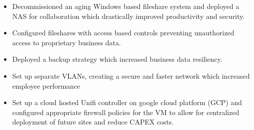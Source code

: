 \begin{itemize}
    \item Decommissioned an aging Windows based fileshare system and deployed a NAS for collaboration which drastically improved productivity and security.
    \item Configured fileshares with access based controls preventing unauthorized access to proprietary business data.
    \item Deployed a backup strategy which increased business data resiliency.
    \item Set up separate VLANs, creating a secure and faster network which increased employee performance
    \item Set up a cloud hosted Unifi controller on google cloud platform (GCP) and configured appropriate firewall policies for the VM to allow for centralized deployment of future sites and reduce CAPEX costs.
\end{itemize}
